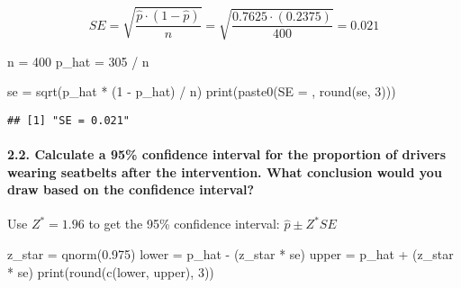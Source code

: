\documentclass[
]{article}
\newenvironment{Shaded}{\begin{snugshade}}{\end{snugshade}}
\newcommand{\DecValTok}[1]{\textcolor[rgb]{0.00,0.00,0.81}{#1}}
\newcommand{\FloatTok}[1]{\textcolor[rgb]{0.00,0.00,0.81}{#1}}
\newcommand{\FunctionTok}[1]{\textcolor[rgb]{0.00,0.00,0.00}{#1}}
\newcommand{\NormalTok}[1]{#1}
\newcommand{\OtherTok}[1]{\textcolor[rgb]{0.56,0.35,0.01}{#1}}
\newcommand{\SpecialCharTok}[1]{\textcolor[rgb]{0.00,0.00,0.00}{#1}}
\newcommand{\StringTok}[1]{\textcolor[rgb]{0.31,0.60,0.02}{#1}}
\begin{document}
\[SE = \sqrt{\frac{\hat{p} \cdot (1-\hat{p})}{n}} = \sqrt{\frac{0.7625 \cdot (0.2375)}{400}}= 0.021\]

\begin{Shaded}
\begin{Highlighting}[]
\NormalTok{n }\OtherTok{=} \DecValTok{400}
\NormalTok{p\_hat }\OtherTok{=} \DecValTok{305} \SpecialCharTok{/}\NormalTok{ n}

\NormalTok{se }\OtherTok{=} \FunctionTok{sqrt}\NormalTok{(p\_hat }\SpecialCharTok{*}\NormalTok{ (}\DecValTok{1} \SpecialCharTok{{-}}\NormalTok{ p\_hat) }\SpecialCharTok{/}\NormalTok{ n)}
\FunctionTok{print}\NormalTok{(}\FunctionTok{paste0}\NormalTok{(}\StringTok{\textquotesingle{}SE = \textquotesingle{}}\NormalTok{, }\FunctionTok{round}\NormalTok{(se, }\DecValTok{3}\NormalTok{)))}
\end{Highlighting}
\end{Shaded}

\begin{verbatim}
## [1] "SE = 0.021"
\end{verbatim}

\hypertarget{calculate-a-95-confidence-interval-for-the-proportion-of-drivers-wearing-seatbelts-after-the-intervention.-what-conclusion-would-you-draw-based-on-the-confidence-interval}{%
\paragraph{2.2. Calculate a 95\% confidence interval for the proportion
of drivers wearing seatbelts after the intervention. What conclusion
would you draw based on the confidence
interval?}\label{calculate-a-95-confidence-interval-for-the-proportion-of-drivers-wearing-seatbelts-after-the-intervention.-what-conclusion-would-you-draw-based-on-the-confidence-interval}}

Use \(Z^*=1.96\) to get the 95\% confidence interval:
\(\hat{p} \pm Z^* SE\)

\begin{Shaded}
\begin{Highlighting}[]
\NormalTok{z\_star }\OtherTok{=} \FunctionTok{qnorm}\NormalTok{(}\FloatTok{0.975}\NormalTok{)}
\NormalTok{lower }\OtherTok{=}\NormalTok{ p\_hat }\SpecialCharTok{{-}}\NormalTok{ (z\_star }\SpecialCharTok{*}\NormalTok{ se)}
\NormalTok{upper }\OtherTok{=}\NormalTok{ p\_hat }\SpecialCharTok{+}\NormalTok{ (z\_star }\SpecialCharTok{*}\NormalTok{ se)}
\FunctionTok{print}\NormalTok{(}\FunctionTok{round}\NormalTok{(}\FunctionTok{c}\NormalTok{(lower, upper), }\DecValTok{3}\NormalTok{))}
\end{Highlighting}
\end{Shaded}
\end{document}
